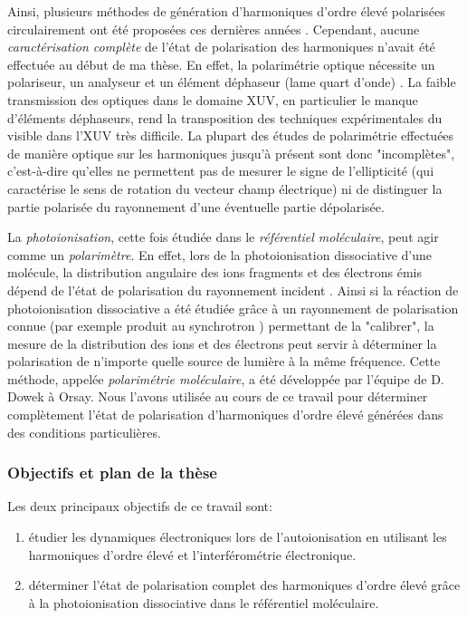 Ainsi, plusieurs méthodes de génération d'harmoniques d'ordre élevé polarisées circulairement ont été proposées ces dernières années . Cependant, aucune \textit{caractérisation complète} de l'état de polarisation des harmoniques n'avait été effectuée au début de ma thèse. En effet, la polarimétrie optique nécessite un polariseur, un analyseur et un élément déphaseur (lame quart d'onde) . La faible transmission des optiques dans le domaine XUV, en particulier le manque d'éléments déphaseurs, rend la transposition des techniques expérimentales du visible dans l'XUV très difficile. La plupart des études de polarimétrie effectuées de manière optique sur les harmoniques jusqu'à présent sont donc "incomplètes", c'est-à-dire qu'elles ne permettent pas de mesurer le signe de l'ellipticité (qui caractérise le sens de rotation du vecteur champ électrique) ni de distinguer la partie polarisée du rayonnement d'une éventuelle partie dépolarisée.

La \textit{photoionisation}, cette fois étudiée dans le \textit{référentiel moléculaire}, peut agir comme un \textit{polarimètre}. En effet, lors de la photoionisation dissociative d'une molécule, la distribution angulaire des ions fragments et des électrons émis dépend de l'état de polarisation du rayonnement incident . Ainsi si la réaction de photoionisation dissociative a été étudiée grâce à un rayonnement de polarisation connue (par exemple produit au synchrotron ) permettant de la "calibrer", la mesure de la distribution des ions et des électrons peut servir à déterminer la polarisation de n'importe quelle source de lumière à la même fréquence. Cette méthode, appelée \textit{polarimétrie moléculaire}, a été développée par l'équipe de D. Dowek à Orsay. Nous l'avons utilisée au cours de ce travail pour déterminer complètement l'état de polarisation d'harmoniques d'ordre élevé générées dans des conditions particulières.

\subsubsection*{Objectifs et plan de la thèse}
Les deux principaux objectifs de ce travail sont:
\begin{enumerate}
\item étudier les dynamiques électroniques lors de l'autoionisation en utilisant les harmoniques d'ordre élevé et l'interférométrie électronique.
\item déterminer l'état de polarisation complet des harmoniques d'ordre élevé grâce à la photoionisation dissociative dans le référentiel moléculaire.
\end{enumerate}

